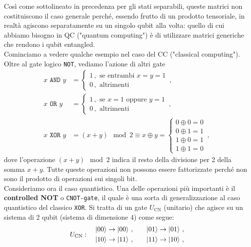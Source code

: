 \noindent Così come sottolineato in precedenza per gli stati separabili, queste matrici non costituiscono il caso generale perché, essendo frutto di un prodotto tensoriale, in realtà agiscono separatamente su un singolo qubit alla volta: quello di cui abbiamo bisogno in QC ("quantum computing") è di utilizzare matrici generiche che rendono i qubit entangled. \\
\noindent Cominciamo a vedere qualche esempio nel caso del CC ("classical computing"). Oltre al gate logico \texttt{NOT}, vediamo l'azione di altri gate
\begin{align*}
    x \texttt{ AND } y &= 
    \begin{cases}
        1 \, , \text{ se entrambi } x = y = 1 \\
        0 \, , \text{ altrimenti}
    \end{cases} \, , \\
    x \texttt{ OR } y &= 
    \begin{cases}
        1 \, , \text{ se } x = 1 \text{ oppure } y = 1 \\
        0 \, , \text{ altrimenti}
    \end{cases} \, , \\
    x \texttt{ XOR } y &= (x + y) \! \! \! \! \mod 2 \equiv x \oplus y = 
    \begin{cases}
        0 \oplus 0 = 0 \\ 
        0 \oplus 1 = 1 \\
        1 \oplus 0 = 1 \\
        1 \oplus 1 = 0
    \end{cases} \, ,
\end{align*}
dove l'operazione $(x + y) \! \! \! \! \mod 2$ indica il resto della divisione per 2 della somma $x+y$. Tutte queste operazioni non possono essere fattorizzate perché non sono il prodotto di operazioni sui singoli bit. \\
\noindent Consideriamo ora il caso quantistico. Una delle operazioni più importanti è il \textbf{controlled NOT} o \texttt{CNOT-gate}, il quale è una sorta di generalizzazione al caso quantistico del classico \texttt{XOR}. Si tratta di un gate $U_{\text{CN}}$ (unitario) che agisce su un sistema di 2 qubit (sistema di dimensione 4) come segue: 
\begin{equation*}
U_{\text{CN}}: \quad
\begin{aligned}
    \ket{00} &\rightarrow \ket{00} \, , \quad &\ket{01} &\rightarrow \ket{01} \, , \\
    \ket{10} &\rightarrow \ket{11} \, , \quad &\ket{11} &\rightarrow \ket{10} \, ,
\end{aligned}
\end{equation*}
